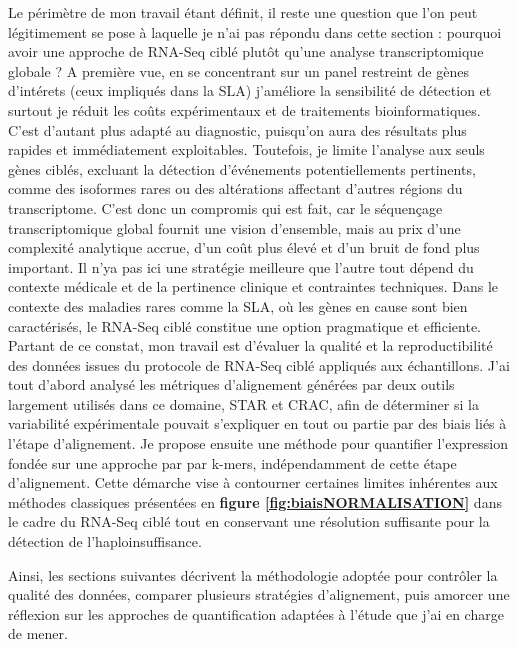 Le périmètre de mon travail étant définit, il reste une question que l'on peut légitimement se pose à laquelle je n'ai pas répondu dans cette section : 
pourquoi avoir une approche de RNA-Seq ciblé plutôt qu'une analyse transcriptomique globale ? 
 A première vue, en se concentrant sur un panel restreint de gènes d’intérets (ceux impliqués dans la SLA) j'améliore la sensibilité de détection et surtout je
 réduit les coûts expérimentaux et de traitements bioinformatiques. C'est d'autant plus adapté au diagnostic, puisqu'on aura des résultats plus rapides et immédiatement exploitables.  
 Toutefois, je limite l’analyse aux seuls gènes ciblés, excluant la détection d’événements potentiellements pertinents, comme des isoformes rares ou des altérations affectant d’autres régions du
  transcriptome. C'est donc un compromis qui est fait, car le séquençage transcriptomique global fournit une vision d’ensemble, mais au prix d’une complexité analytique accrue, d’un coût plus élevé
   et d’un bruit de fond plus important.  
Il n'ya pas ici une stratégie meilleure que l'autre tout dépend du contexte médicale et de la pertinence clinique et contraintes techniques.
 Dans le contexte des maladies rares comme la SLA, où les gènes en cause sont bien caractérisés, le RNA-Seq ciblé constitue une option pragmatique et efficiente.\\

Partant de ce constat, mon travail est d'évaluer la qualité et la reproductibilité des données issues du protocole de RNA-Seq ciblé appliqués aux échantillons.
J’ai tout d’abord analysé les métriques d’alignement générées par deux outils largement utilisés dans ce domaine,
 STAR et CRAC, afin de déterminer si la variabilité expérimentale pouvait s’expliquer en tout ou partie par des biais liés à l'étape d’alignement.
Je propose ensuite une méthode pour quantifier l'expression fondée sur une approche par par k-mers, indépendamment de cette étape d’alignement.
Cette démarche vise à contourner certaines limites inhérentes aux méthodes classiques présentées en \textbf{figure \ref{fig:biaisNORMALISATION}}
 dans le cadre du RNA-Seq ciblé tout en conservant une résolution suffisante pour la détection de l'haploinsuffisance.

Ainsi, les sections suivantes décrivent la méthodologie adoptée pour contrôler la qualité des données, 
comparer plusieurs stratégies d’alignement, puis amorcer une réflexion sur les approches de quantification adaptées à l'étude que j'ai en charge de mener. 
